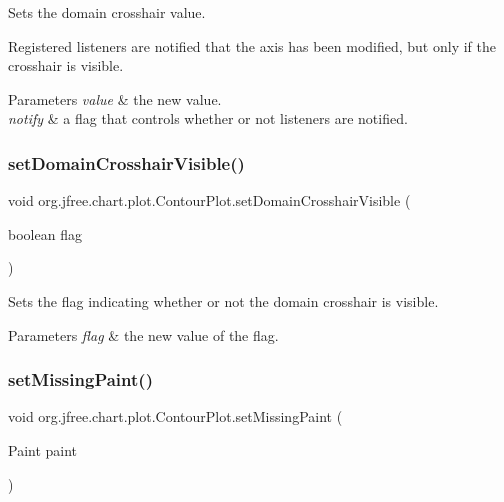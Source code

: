 Sets the domain crosshair value. 

Registered listeners are notified that the axis has been modified, but only if the crosshair is visible.


\begin{DoxyParams}{Parameters}
{\em value} & the new value. \\
\hline
{\em notify} & a flag that controls whether or not listeners are notified. \\
\hline
\end{DoxyParams}
\mbox{\label{classorg_1_1jfree_1_1chart_1_1plot_1_1_contour_plot_a1c5e5c3da5cedb8b85b73aaaad7dd0fe}} 
\subsubsection{\texorpdfstring{set\+Domain\+Crosshair\+Visible()}{setDomainCrosshairVisible()}}
{\footnotesize\ttfamily void org.\+jfree.\+chart.\+plot.\+Contour\+Plot.\+set\+Domain\+Crosshair\+Visible (\begin{DoxyParamCaption}\item[{boolean}]{flag }\end{DoxyParamCaption})}

Sets the flag indicating whether or not the domain crosshair is visible.


\begin{DoxyParams}{Parameters}
{\em flag} & the new value of the flag. \\
\hline
\end{DoxyParams}
\mbox{\label{classorg_1_1jfree_1_1chart_1_1plot_1_1_contour_plot_a7965decd5f2983c5bcfa66cda1d83849}} 
\subsubsection{\texorpdfstring{set\+Missing\+Paint()}{setMissingPaint()}}
{\footnotesize\ttfamily void org.\+jfree.\+chart.\+plot.\+Contour\+Plot.\+set\+Missing\+Paint (\begin{DoxyParamCaption}\item[{Paint}]{paint }\end{DoxyParamCaption})}

